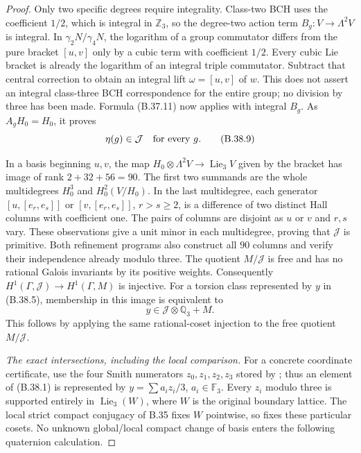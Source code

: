 \begin{proof}
Only two specific degrees require integrality.
Class-two BCH uses the coefficient $1/2$, which is
integral in $\mathbb Z_3$, so the degree-two action
term $B_g:V\to\Lambda^2V$ is integral.
In $\gamma_2N/\gamma_4N$, the logarithm of a group
commutator differs from the pure bracket $[u,v]$
only by a cubic term with coefficient $1/2$.
Every cubic Lie bracket is already the logarithm
of an integral triple commutator. Subtract that
central correction to obtain an integral lift
$\omega=[u,v]$ of $w$.
This does not assert an integral class-three BCH
correspondence for the entire group; no division by
three has been made.
Formula (B.37.11) now applies with integral $B_g$.
As $A_gH_0=H_0$, it proves
\[
                  \eta(g)\in\mathcal J
                      \quad\hbox{for every }g.              \tag{B.38.9}
\]

In a basis beginning $u,v$, the map
$H_0\otimes\Lambda^2V\to\operatorname{Lie}_3V$
given by the bracket has image of rank
$2+32+56=90$.
The first two summands are the whole multidegrees
$H_0^3$ and $H_0^2(V/H_0)$.
In the last multidegree, each generator
$[u,[e_r,e_s]]$ or $[v,[e_r,e_s]]$, $r>s\ge2$,
is a difference of two distinct Hall columns with
coefficient one. The pairs of columns are disjoint
as $u$ or $v$ and $r,s$ vary.
These observations give a unit minor in each
multidegree, proving that $\mathcal J$ is primitive.
Both refinement programs also construct all $90$
columns and verify their independence already
modulo three.
The quotient $M/\mathcal J$ is free and has no
rational Galois invariants by its positive weights.
Consequently
$H^1(\Gamma,\mathcal J)\to H^1(\Gamma,M)$ is injective.
For a torsion class represented by $y$ in (B.38.5),
membership in this image is equivalent to
\[
                    y\in\mathcal J\otimes\mathbb Q_3+M.
                                                               \tag{B.38.10}
\]
This follows by applying the same rational-coset
injection to the free quotient $M/\mathcal J$.

\emph{The exact intersections, including the local comparison.}
For a concrete coordinate certificate, use the four
Smith numerators $z_0,z_1,z_2,z_3$ stored by
; thus an element
of (B.38.1) is represented by
$y=\sum a_i z_i/3$, $a_i\in\mathbb F_3$.
Every $z_i$ modulo three is supported entirely in
$\operatorname{Lie}_3(W)$, where $W$ is the original
boundary lattice. The local strict compact conjugacy
of B.35 fixes $W$ pointwise, so fixes these particular
cosets. No unknown global/local compact change of
basis enters the following quaternion calculation.


\end{proof}
